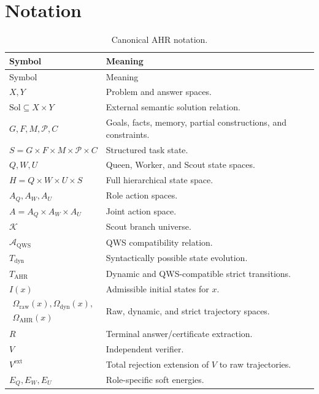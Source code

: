 \documentclass[11pt,oneside]{book}
\theoremstyle{remark}
\newcommand{\Sol}{\mathrm{Sol}}
\newcommand{\AQWS}{\mathcal A_{\mathrm{QWS}}}
\newcommand{\Om}{\Omega}
\begin{document}
\appendix

\chapter{Notation}

{\small
\begin{longtable}{>{\RaggedRight\arraybackslash}p{}
>{\RaggedRight\arraybackslash}p{}}
\caption{Canonical AHR notation.}\\
\toprule
Symbol & Meaning \\
\midrule
\endfirsthead
\toprule
Symbol & Meaning \\
\midrule
\endhead
$X,Y$ & Problem and answer spaces. \\
$\Sol\subseteq X\times Y$ & External semantic solution relation. \\
$G,F,M,\mathcal P,C$ & Goals, facts, memory, partial constructions, and constraints. \\
$S=G\times F\times M\times\mathcal P\times C$ & Structured task state. \\
$Q,W,U$ & Queen, Worker, and Scout state spaces. \\
$H=Q\times W\times U\times S$ & Full hierarchical state space. \\
$A_Q,A_W,A_U$ & Role action spaces. \\
$A=A_Q\times A_W\times A_U$ & Joint action space. \\
$\mathcal K$ & Scout branch universe. \\
$\AQWS$ & QWS compatibility relation. \\
$T_{\mathrm{dyn}}$ & Syntactically possible state evolution. \\
$T_{\mathrm{AHR}}$ & Dynamic and QWS-compatible strict transitions. \\
$I(x)$ & Admissible initial states for $x$. \\
$\begin{gathered}\Om_{\mathrm{raw}}(x),\Om_{\mathrm{dyn}}(x),\\
\Om_{\mathrm{AHR}}(x)\end{gathered}$ & Raw, dynamic, and strict trajectory spaces. \\
$R$ & Terminal answer/certificate extraction. \\
$V$ & Independent verifier. \\
$V^{\mathrm{ext}}$ & Total rejection extension of $V$ to raw trajectories. \\
$E_Q,E_W,E_U$ & Role-specific soft energies. \\

\end{longtable}}
\end{document}
